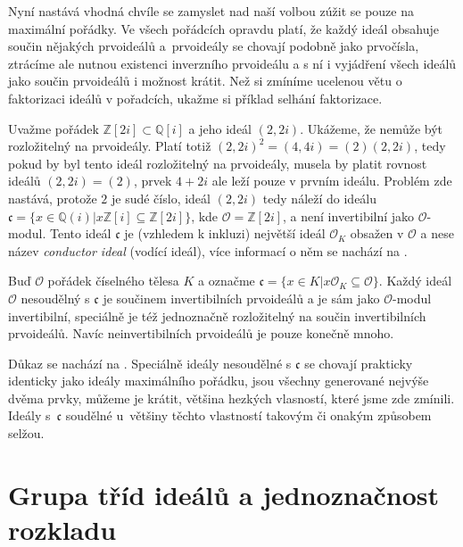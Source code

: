 \documentclass[12pt]{report}
\begin{document}
Nyní nastává vhodná chvíle se zamyslet nad naší volbou zúžit se pouze na maximální pořádky. Ve všech pořádcích opravdu platí, že každý ideál obsahuje součin nějakých prvoideálů a~prvoideály se chovají podobně jako prvočísla, ztrácíme ale nutnou existenci inverzního prvoideálu a s ní i vyjádření všech ideálů jako součin prvoideálů i možnost krátit. Než si zmíníme ucelenou větu o faktorizaci ideálů v pořadcích, ukažme si příklad selhání faktorizace.

\begin{priklad}
Uvažme pořádek $\mathbb{Z}[2i] \subset \mathbb{Q}[i]$ a jeho ideál $(2,2i)$. Ukážeme, že nemůže být rozložitelný na prvoideály. Platí totiž $(2,2i)^2 = (4,4i) = (2)(2,2i)$, tedy pokud by byl tento ideál rozložitelný na prvoideály, musela by platit rovnost ideálů $(2,2i) = (2)$, prvek $4+2i$ ale leží pouze v prvním ideálu. Problém zde nastává, protože $2$ je sudé číslo, ideál $(2,2i)$ tedy náleží do ideálu $\mathfrak{c} = \lbrace x \in \mathbb{Q}(i) \vert x \mathbb{Z}[i] \subseteq \mathbb{Z}[2i] \rbrace$, kde $\mathcal{O} = \mathbb{Z}[2i]$, a není invertibilní jako $\mathcal{O}$-modul. Tento ideál $\mathfrak{c}$ je (vzhledem k inkluzi) největší ideál $\mathcal{O}_K$ obsažen v $\mathcal{O}$ a nese název \textit{conductor ideal} (vodící ideál), více informací o něm se nachází na \cite{Conrad3}.
\end{priklad}

\begin{veta}
Buď $\mathcal{O}$ pořádek číselného tělesa $K$ a označme $\mathfrak{c} = \lbrace x \in K \vert x \mathcal{O}_K \subseteq \mathcal{O} \rbrace$. Každý ideál $\mathcal{O}$ nesoudělný s $\mathfrak{c}$ je součinem invertibilních prvoideálů a je sám jako $\mathcal{O}$-modul invertibilní, speciálně je též jednoznačně rozložitelný na součin invertibilních prvoideálů. Navíc neinvertibilních prvoideálů je pouze konečně mnoho.
\end{veta}

Důkaz se nachází na \cite[Sec. 3.]{Conrad3}. Speciálně ideály nesoudělné s $\mathfrak{c}$ se chovají prakticky identicky jako ideály maximálního pořádku, jsou všechny generované nejvýše dvěma prvky, můžeme je krátit, většina hezkých vlasností, které jsme zde zmínili. Ideály s~$\mathfrak{c}$ soudělné u~většiny těchto vlastností takovým či onakým způsobem selžou.

 

\section{Grupa tříd ideálů a jednoznačnost rozkladu}
\end{document}

